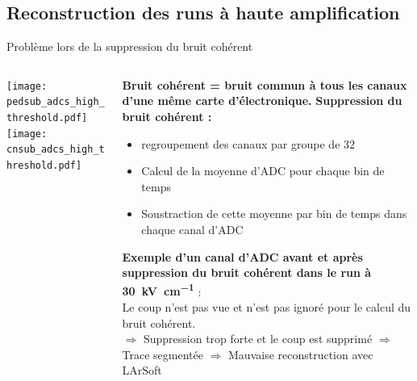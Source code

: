     \subsection{Reconstruction des runs à haute amplification}
    
    \begin{frame}{Problème lors de la suppression du bruit cohérent}
        \begin{scriptsize}
            \begin{columns}
                \begin{column}{0.5\textwidth}
                    \centering \texttt{[image: pedsub\_adcs\_high\_threshold.pdf]}\\
                    \centering \texttt{[image: cnsub\_adcs\_high\_threshold.pdf]}\\
                 \end{column}
                \begin{column}{0.5\textwidth}
                    \textbf{Bruit cohérent = bruit commun à tous les canaux d'une même carte d'électronique.} 
                    \textbf{Suppression du bruit cohérent :} 
                    \begin{itemize}
                        \item regroupement des canaux par groupe de 32
                        \item Calcul de la moyenne d'ADC pour chaque bin de temps
                        \item Soustraction de cette moyenne par bin de temps dans chaque canal d'ADC
                    \end{itemize}
                   \textbf{ Exemple d'un canal d'ADC avant et après suppression du bruit cohérent dans le run à \SI{30}{\kilo\volt\per\centi\meter} }: \\Le coup n'est pas vue et n'est pas ignoré pour le calcul du bruit cohérent. \\
                   $\Rightarrow$ Suppression trop forte et le coup est supprimé
                   $\Rightarrow$ Trace segmentée
                   $\Rightarrow$ Mauvaise reconstruction avec LArSoft
                \end{column}
            \end{columns}
        \end{scriptsize}
    \end{frame}

